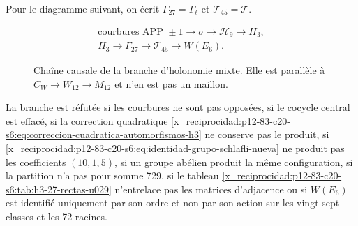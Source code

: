 Pour le diagramme suivant, on écrit
\(\Gamma_{27}=\Gamma_\ell\) et \(\mathcal T_{45}=\mathcal T\).
\begin{figure}[htbp]
\centering
\[
 \begin{gathered}
 \text{courbures APP }\pm1
 \longrightarrow\sigma
 \longrightarrow\mathcal H_9
 \longrightarrow H_3,\\[3pt]
 H_3
 \longrightarrow\Gamma_{27}
 \longrightarrow\mathcal T_{45}
 \longrightarrow W(E_6).
 \end{gathered}
\]
\caption{Chaîne causale de la branche d’holonomie mixte. Elle est parallèle à
\(C_W\to W_{12}\to M_{12}\) et n’en est pas un maillon.}
\label{x_reciprocidad:p12-83-c20-s6:fig:cadena-holonomia-e6-u029}
\end{figure}

\begin{criterion}
\label{x_reciprocidad:p12-83-c20-s6:crit:refutacion-rama-e6-u029}
La branche est réfutée si les courbures ne sont pas opposées, si le cocycle
central est effacé, si la correction quadratique
\eqref{x_reciprocidad:p12-83-c20-s6:eq:correccion-cuadratica-automorfismos-h3} ne conserve pas le produit,
si \eqref{x_reciprocidad:p12-83-c20-s6:eq:identidad-grupo-schlafli-nueva} ne produit pas les coefficients
\((10,1,5)\), si un groupe abélien produit la même configuration, si la
partition n’a pas pour somme 729, si le tableau
\ref{x_reciprocidad:p12-83-c20-s6:tab:h3-27-rectas-u029} n’entrelace pas les matrices d’adjacence ou si
\(W(E_6)\) est identifié uniquement par son ordre et non par son action sur les
vingt-sept classes et les 72 racines.
\end{criterion}
